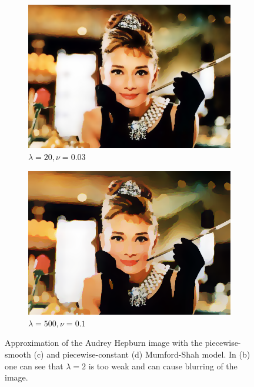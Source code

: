 \documentclass[abstracton]{scrreprt}
\begin{document}
\begin{figure}[!ht]
\begin{subfigure}[b]{0.4\textwidth}
                    \includegraphics[width=\textwidth]{img/cartooning/best_pws_hepburn.png}
                    \caption{$\lambda = 20, \nu = 0.03$}
                \end{subfigure}
                \begin{subfigure}[b]{0.4\textwidth}
                    \includegraphics[width=\textwidth]{img/cartooning/best_pwc_hepburn.png}
                    \caption{$\lambda = 500, \nu = 0.1$}
                \end{subfigure}
                \caption[Comparing Audrey Hepburn pwc. and pws. using real-time Mumford-Shah model.]{Approximation of the Audrey Hepburn image with the piecewise-smooth (c) and piecewise-constant (d) Mumford-Shah model. In (b) one can see that $\lambda = 2$ is too weak and can cause blurring of the image.}
            \label{fig:estimation_of_lambda_and_nu_rt}
            \end{figure}
\end{document}
